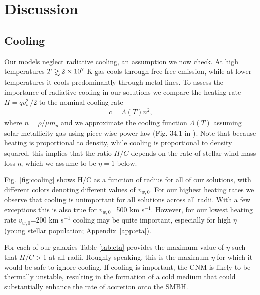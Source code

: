 \documentclass[usenatbib,fleqn]{mn2e}
\newcommand\lsim{\mathrel{\rlap{\lower4pt\hbox{\hskip1pt$\sim$}}
    \raise1pt\hbox{$<$}}}
\newcommand\gsim{\mathrel{\rlap{\lower4pt\hbox{\hskip1pt$\sim$}}
    \raise1pt\hbox{$>$}}}
\newcommand{\vw}{v_w}
\newcommand{\vwO}{v_{w,0}}
\begin{document}
\section{Discussion}
\label{sec:discussion}

\subsection{Cooling}
\label{sec:cooling}
Our models neglect radiative cooling, an assumption we now check.  At
high temperatures $T\gsim 2\times 10^7$ K gas cools through free-free
emission, while at lower temperatures it cools predominantly through
metal lines.  To assess the importance of radiative cooling in our
solutions we compare the heating rate $H=q \vw^2/2$ to the nominal
cooling rate
\begin{align}
  c =\Lambda(T) n^2,
\label{eq:cooling}
\end{align}
where $n = \rho/\mu m_p$ and we approximate the cooling function $\Lambda(T)$ assuming solar metallicity gas using piece-wise power law (Fig. 34.1 in \cite{Draine:2011a}).   Note that because heating is proportional to density, while cooling is proportional to density squared, this implies that the ratio $H/C$ depends on the rate of stellar wind mass loss $\eta$, which we assume to be $\eta = 1$ below.

Fig.~\ref{fig:cooling} shows H/C as a function of radius for all of our solutions, with different colors denoting different values of $v_{w,0}$.  For our highest heating rates we observe that cooling is unimportant for all solutions across all radii.  With a few exceptions this is also true for $\vwO$=500 km s$^{-1}$.  However, for our lowest heating rate $\vwO$=200 km s$^{-1}$ cooling may be quite important, especially for high $\eta$ (young stellar population;  Appendix~\ref{app:eta}).  

For each of our galaxies Table \ref{tab:eta} provides the maximum value of $\eta$ such that $H/C >$1 at all radii.  Roughly speaking, this is the maximum $\eta$ for which it would be safe to ignore cooling.  If cooling is important, the CNM is likely to be thermally unstable, resulting in the formation of a cold medium that could substantially enhance the rate of accretion onto the SMBH.  

\end{document}
